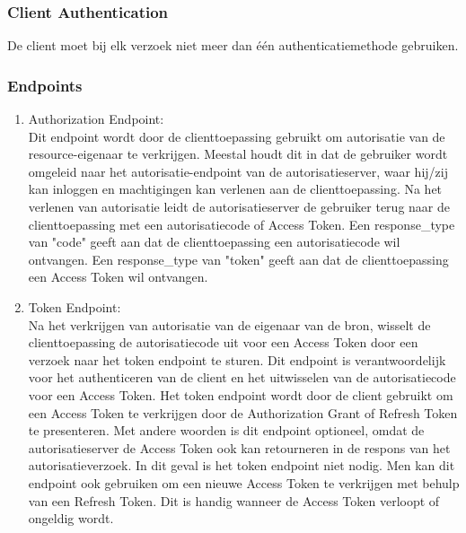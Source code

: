 \subsubsection{Client Authentication}
\label{subsubsec:client-authentication}
De client moet bij elk verzoek niet meer dan één authenticatiemethode gebruiken.

\subsubsection{Endpoints}%
\label{subsubsec:endpoints}
\begin{enumerate}[label=\textbf{-}]
    \item Authorization Endpoint: \\
    Dit endpoint wordt door de clienttoepassing gebruikt om autorisatie van de resource-eigenaar te verkrijgen. Meestal houdt dit in dat de gebruiker wordt omgeleid naar het autorisatie-endpoint van de autorisatieserver, waar hij/zij kan inloggen en machtigingen kan verlenen aan de clienttoepassing. Na het verlenen van autorisatie leidt de autorisatieserver de gebruiker terug naar de clienttoepassing met een autorisatiecode of Access Token.
    \newline
    Een response_type van "code" geeft aan dat de clienttoepassing een autorisatiecode wil ontvangen. Een response_type van "token" geeft aan dat de clienttoepassing een Access Token wil ontvangen.
  
    \item Token Endpoint: \\
    Na het verkrijgen van autorisatie van de eigenaar van de bron, wisselt de clienttoepassing de autorisatiecode uit voor een Access Token door een verzoek naar het token endpoint te sturen. Dit endpoint is verantwoordelijk voor het authenticeren van de client en het uitwisselen van de autorisatiecode voor een Access Token. Het token endpoint wordt door de client gebruikt om een Access Token te verkrijgen door de Authorization Grant of Refresh Token te presenteren.
    \newline
    Met andere woorden is dit endpoint optioneel, omdat de autorisatieserver de Access Token ook kan retourneren in de respons van het autorisatieverzoek. In dit geval is het token endpoint niet nodig.
    \newline
    Men kan dit endpoint ook gebruiken om een nieuwe Access Token te verkrijgen met behulp van een Refresh Token. Dit is handig wanneer de Access Token verloopt of ongeldig wordt.
  

\end{enumerate}
